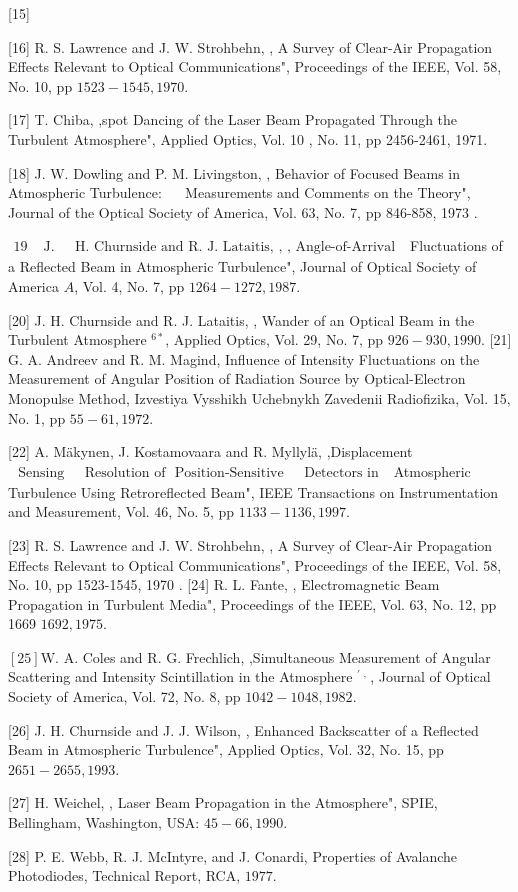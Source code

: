 \documentclass[10pt]{article}
\begin{document}
[15] %

[16] R. S. Lawrence and J. W. Strohbehn, , A Survey of Clear-Air Propagation Effects Relevant to Optical Communications", Proceedings of the IEEE, Vol. 58, No. 10, pp \(1523-1545,1970\).

[17] T. Chiba, ,spot Dancing of the Laser Beam Propagated Through the Turbulent Atmosphere", Applied Optics, Vol. 10 , No. 11, pp 2456-2461, 1971.

[18] J. W. Dowling and P. M. Livingston, , Behavior of Focused Beams in Atmospheric Turbulence: \(\quad\) Measurements and Comments on the Theory", Journal of the Optical Society of America, Vol. 63, No. 7, pp 846-858, 1973 .

\(\begin{array}{lllllll}19 & \text { J. } & \text { H. Churnside and R. J. Lataitis, }, \text { , Angle-of-Arrival }\end{array}\) Fluctuations of a Reflected Beam in Atmospheric Turbulence", Journal of Optical Society of America \(A\), Vol. 4, No. 7, pp \(1264-1272,1987 .\)

[20] J. H. Churnside and R. J. Lataitis, , Wander of an Optical Beam in the Turbulent Atmosphere \(^{6 *}\), Applied Optics, Vol. 29, No. 7, pp \(926-930,1990\). [21] G. A. Andreev and R. M. Magind, Influence of Intensity Fluctuations on the Measurement of Angular Position of Radiation Source by Optical-Electron Monopulse Method, Izvestiya Vysshikh Uchebnykh Zavedenii Radiofizika, Vol. 15, No. 1, pp \(55-61,1972 .\)

[22] A. Mäkynen, J. Kostamovaara and R. Myllylä, ,Displacement \(\begin{array}{lll}\text { Sensing } & \text { Resolution of } \text { Position-Sensitive } & \text { Detectors in }\end{array}\) Atmospheric Turbulence Using Retroreflected Beam", IEEE Transactions on Instrumentation and Measurement, Vol. 46, No. 5, pp \(1133-1136,1997 .\)

[23] R. S. Lawrence and J. W. Strohbehn, , A Survey of Clear-Air Propagation Effects Relevant to Optical Communications", Proceedings of the IEEE, Vol. 58, No. 10, pp 1523-1545, 1970 . [24] R. L. Fante, , Electromagnetic Beam Propagation in Turbulent Media", Proceedings of the IEEE, Vol. 63, No. 12, pp 1669 \(1692,1975 .\)

\([25] \mathrm{W} .\) A. Coles and \(\mathrm{R}\). G. Frechlich, ,Simultaneous Measurement of Angular Scattering and Intensity Scintillation in the Atmosphere \(^{\prime \text { , }}\), Journal of Optical Society of America, Vol. 72, No. 8, pp \(1042-1048,1982 .\)

[26] J. H. Churnside and J. J. Wilson, , Enhanced Backscatter of a Reflected Beam in Atmospheric Turbulence", Applied Optics, Vol. 32, No. 15, pp \(2651-2655,1993\).

[27] H. Weichel, , Laser Beam Propagation in the Atmosphere", SPIE, Bellingham, Washington, USA: \(45-66,1990 .\)

[28] P. E. Webb, R. J. McIntyre, and J. Conardi, Properties of Avalanche Photodiodes, Technical Report, RCA, \(1977 .\)
\end{document}
